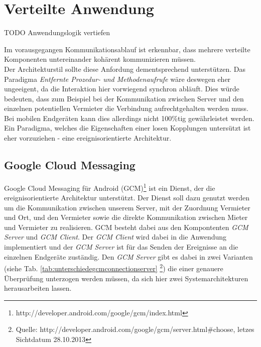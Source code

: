 
\section{Verteilte Anwendung}

TODO Anwendungslogik vertiefen

Im vorausgegangen Kommunikationsablauf ist erkennbar, dass mehrere verteilte Komponenten untereinander kohärent kommunizieren müssen.\\

Der Architekturstil sollte diese Anfordung dementsprechend unterstützen. Das Paradigma \textit{Entfernte Prozedur- und Methodenaufrufe} wäre deswegen eher ungeeigent, da die Interaktion hier vorwiegend synchron abläuft. Dies würde bedeuten, dass zum Beispiel bei der Kommunikation zwischen Server und den einzelnen potentiellen Vermieter die Verbindung aufrechtgehalten werden muss. Bei mobilen Endgeräten kann dies allerdings nicht 100\%tig gewährleistet werden.
Ein Paradigma, welches die Eigenschaften einer losen Kopplungen untersützt ist eher vorzuziehen - eine ereignisorientierte Architektur.\\



\subsection{Google Cloud Messaging}

Google Cloud Messaging für Android (GCM)\footnote{http://developer.android.com/google/gcm/index.html} ist ein Dienst, der die ereignisorientierte Architektur unterstützt.
Der Dienst soll dazu genutzt werden um die Kommunikation zwischen unserem Server, mit der Zuordnung Vermieter und Ort, und den Vermieter sowie die direkte Kommunikation zwischen Mieter und Vermieter zu realisieren.
GCM besteht dabei aus den Kompontenten \textit{GCM Server} und \textit{GCM Client}.
Der \textit{GCM Client} wird dabei in die Anwendung implementiert und der \textit{GCM Server} ist für das Senden der Ereignisse an die einzelnen Endgeräte zuständig. Den \textit{GCM Server} gibt es dabei in zwei Varianten (siehe Tab. \ref{tab:unterschiedegcmconnectionserver} \footnote{Quelle: http://developer.android.com/google/gcm/server.html\#choose, letzes Sichtdatum 28.10.2013}) die einer genauere Überprüfung unterzogen werden müssen, da sich hier zwei Systemarchitekturen herausarbeiten lassen.

